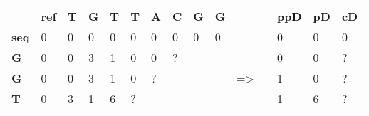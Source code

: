\begin{table}[H]
	\centering
	\begin{tabular}{|l|lllllllllll|l|l|l|}
		\cline{1-10} \cline{13-15}
		\multicolumn{1}{|c|}{\textbf{}} & \multicolumn{1}{r|}{\textbf{ref}} & \multicolumn{1}{l|}{\textbf{T}} & \multicolumn{1}{l|}{\textbf{G}} & \multicolumn{1}{l|}{\textbf{T}} & \multicolumn{1}{l|}{\textbf{T}} & \multicolumn{1}{l|}{\textbf{A}} & \multicolumn{1}{l|}{\textbf{C}} & \multicolumn{1}{l|}{\textbf{G}} & \multicolumn{1}{l|}{\textbf{G}} & \textbf{}       & \textbf{} & \textbf{ppD}              & \textbf{pD}               & \textbf{cD}               \\ \cline{1-10} \cline{13-15} 
		\textbf{seq}                    & 0                                 & 0                               & 0                               & 0                               & 0                               & \cellcolor[HTML]{9AFF99}0       & \cellcolor[HTML]{96FFFB}0       & \cellcolor[HTML]{FFCCC9}0       & 0                               &                 &           & \cellcolor[HTML]{9AFF99}0 & \cellcolor[HTML]{96FFFB}0 & \cellcolor[HTML]{FFCCC9}0 \\ \cline{1-1} \cline{13-15} 
		\textbf{G}                      & 0                                 & 0                               & 3                               & 1                               & \cellcolor[HTML]{9AFF99}0       & \cellcolor[HTML]{96FFFB}0       & \cellcolor[HTML]{FFCCC9}?       &                                 &                                 &                 &           & \cellcolor[HTML]{9AFF99}0 & \cellcolor[HTML]{96FFFB}0 & \cellcolor[HTML]{FFCCC9}? \\ \cline{1-1} \cline{13-15} 
		\textbf{G}                      & 0                                 & 0                               & 3                               & \cellcolor[HTML]{9AFF99}1       & \cellcolor[HTML]{96FFFB}0       & \cellcolor[HTML]{FFCCC9}?       &                                 &                                 &                                 & =\textgreater{} &           & \cellcolor[HTML]{9AFF99}1 & \cellcolor[HTML]{96FFFB}0 & \cellcolor[HTML]{FFCCC9}? \\ \cline{1-1} \cline{13-15} 
		\textbf{T}                      & 0                                 & 3                               & \cellcolor[HTML]{9AFF99}1       & \cellcolor[HTML]{96FFFB}6       & \cellcolor[HTML]{FFCCC9}?       &                                 &                                 &                                 &                                 &                 &           & \cellcolor[HTML]{9AFF99}1 & \cellcolor[HTML]{96FFFB}6 & \cellcolor[HTML]{FFCCC9}? \\ \cline{1-1} \cline{13-15} 

\end{tabular}
\end{table}
